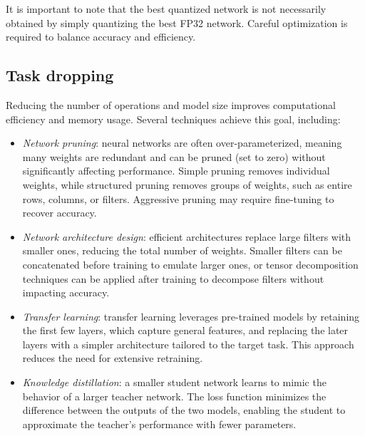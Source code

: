 It is important to note that the best quantized network is not necessarily obtained by simply quantizing the best FP32 network. 
Careful optimization is required to balance accuracy and efficiency.


\subsection{Task dropping}
Reducing the number of operations and model size improves computational efficiency and memory usage. 
Several techniques achieve this goal, including:
\begin{itemize}
    \item \textit{Network pruning}: neural networks are often over-parameterized, meaning many weights are redundant and can be pruned (set to zero) without significantly affecting performance. 
        Simple pruning removes individual weights, while structured pruning removes groups of weights, such as entire rows, columns, or filters. 
        Aggressive pruning may require fine-tuning to recover accuracy.
    \item \textit{Network architecture design}: efficient architectures replace large filters with smaller ones, reducing the total number of weights. 
        Smaller filters can be concatenated before training to emulate larger ones, or tensor decomposition techniques can be applied after training to decompose filters without impacting accuracy.
    \item \textit{Transfer learning}: transfer learning leverages pre-trained models by retaining the first few layers, which capture general features, and replacing the later layers with a simpler architecture tailored to the target task. 
        This approach reduces the need for extensive retraining.
    \item \textit{Knowledge distillation}: a smaller student network learns to mimic the behavior of a larger teacher network. 
        The loss function minimizes the difference between the outputs of the two models, enabling the student to approximate the teacher's performance with fewer parameters.
\end{itemize}